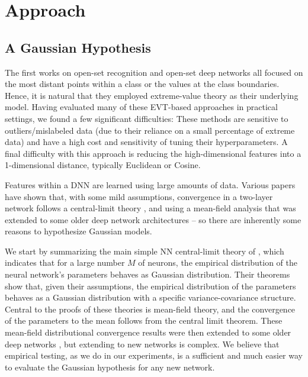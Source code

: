 
\section{Approach}
\subsection{A Gaussian Hypothesis}
\label{sec:approach}

The first works on open-set recognition and open-set deep networks \cite{scheirer2012toward,scheirer2014probability,bendale2016openmax,rudd2017evm} all focused on the most distant points within a class or the values at the class boundaries.  
Hence, it is natural that they employed extreme-value theory as their underlying model. 
Having evaluated many of these EVT-based approaches in practical settings, we found a few significant difficulties: These methods are sensitive to outliers/mislabeled data (due to their reliance on a small percentage of extreme data) and have a high cost and sensitivity of tuning their hyperparameters.  
A final difficulty with this approach is reducing the high-dimensional features into a 1-dimensional distance, typically Euclidean or Cosine.


Features within a DNN are learned using large amounts of data.   
Various papers have shown that, with some mild assumptions, convergence in a two-layer network follows a central-limit theory \cite{sirignano2020mean}, and using a mean-field analysis that was extended to some older deep network architectures \cite{lu2020mean} -- so there are inherently some reasons to hypothesize Gaussian models. 

We start by summarizing the main simple NN central-limit theory of \cite{sirignano2020mean}, which indicates that for a large number $M$ of neurons, the empirical distribution of the neural network's parameters behaves as  Gaussian distribution. 
Their theorems show that, given their assumptions, the empirical distribution of the parameters behaves as a Gaussian distribution with a specific variance-covariance structure.  
Central to the proofs of these theories is mean-field theory, and the convergence of the parameters to the mean follows from the central limit theorem. These mean-field distributional convergence results were then extended to some older deep networks \cite{lu2020mean}, but extending to new networks is complex.  
We believe that empirical testing, as we do in our experiments, is a sufficient and much easier way to evaluate the Gaussian hypothesis for any new network.


